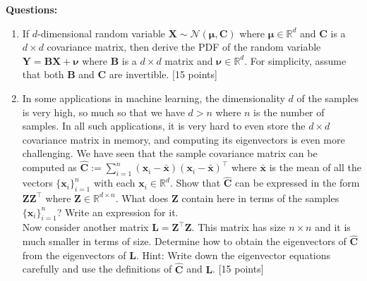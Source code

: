 \documentclass[11pt]{article}
\begin{document}
\textbf{Questions:}
\begin{enumerate}
\item If $d$-dimensional random variable $\boldsymbol{X} \sim \mathcal{N}(\boldsymbol{\mu}, \boldsymbol{C})$ where $\boldsymbol{\mu} \in \mathbb{R}^d$ and $\boldsymbol{C}$ is a $d \times d$ covariance matrix, then derive the PDF of the random variable $\boldsymbol{Y} = \boldsymbol{BX} + \boldsymbol{\nu}$ where $\boldsymbol{B}$ is a $d \times d$ matrix and $\boldsymbol{\nu} \in \mathbb{R}^d$. For simplicity, assume that both $\boldsymbol{B}$ and $\boldsymbol{C}$ are invertible. \textsf{[15 points]}

\item In some applications in machine learning, the dimensionality $d$ of the samples is very high, so much so that we have $d > n$ where $n$ is the number of samples. In all such applications, it is very hard to even store the $d \times d$ covariance matrix in memory, and computing its eigenvectors is even more challenging. We have seen that the sample covariance matrix can be computed as $\boldsymbol{\hat{C}} := \sum_{i=1}^n (\boldsymbol{x}_i - \boldsymbol{\bar{x}})(\boldsymbol{x}_i - \boldsymbol{\bar{x}})^{\top}$ where $\boldsymbol{\bar{x}}$ is the mean of all the vectors $\{\boldsymbol{x}_i\}_{i=1}^n$ with each $\boldsymbol{x}_i \in \mathbb{R}^d$. Show that $\boldsymbol{\hat{C}}$ can be expressed in the form $\boldsymbol{ZZ}^{\top}$ where $\boldsymbol{Z} \in \mathbb{R}^{d \times n}$. What does $\boldsymbol{Z}$ contain here in terms of the samples $\{\boldsymbol{x}_i\}_{i=1}^n$? Write an expression for it. \\
Now consider another matrix $\boldsymbol{L} = \boldsymbol{Z}^{\top}\boldsymbol{Z}$. This matrix has size $n \times n$ and it is much smaller in terms of size. Determine how to obtain the eigenvectors of $\boldsymbol{\hat{C}}$ from the eigenvectors of $\boldsymbol{L}$. Hint: Write down the eigenvector equations carefully and use the definitions of $\boldsymbol{\hat{C}}$ and $\boldsymbol{L}$.
\textsf{[15 points]}


\end{enumerate}
\end{document}
